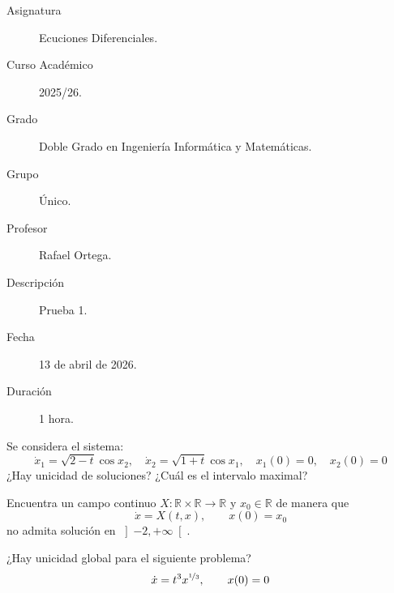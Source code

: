 \documentclass[12pt]{article}
\begin{document}

    
    

    \begin{description}
        \item[Asignatura] Ecuciones Diferenciales.
        \item[Curso Académico] 2025/26.
        \item[Grado] Doble Grado en Ingeniería Informática y Matemáticas.
        \item[Grupo] Único.
        \item[Profesor] Rafael Ortega.
        \item[Descripción] Prueba 1.
        \item[Fecha] 13 de abril de 2026.
        \item[Duración] 1 hora.
    
    \end{description}
    \newpage


    
    \begin{ejercicio}
        Se considera el sistema:
        \begin{equation*}
            \dot{x}_1 = \sqrt{2-t}\cos x_2,\quad \dot{x}_2 = \sqrt{1+t}\cos x_1, \quad x_1(0) = 0, \quad x_2(0) = 0
        \end{equation*}
        ¿Hay unicidad de soluciones? ¿Cuál es el intervalo maximal?
    \end{ejercicio}

    \begin{ejercicio}
        Encuentra un campo continuo $X:\mathbb{R}\times\mathbb{R}\to \mathbb{R}$ y $x_0\in \mathbb{R}$ de manera que
        \begin{equation*}
            \dot{x} = X(t,x), \qquad x(0) = x_0
        \end{equation*}
        no admita solución en $\left]-2,+\infty\right[$.
    \end{ejercicio}

    \begin{ejercicio}
        ¿Hay unicidad global para el siguiente problema?
        \begin{equation*}
            \dot{x} = t^3 x^{\nicefrac{1}{3}}, \qquad x(0) = 0
        \end{equation*}
    \end{ejercicio}
\end{document}
